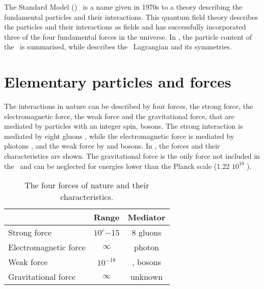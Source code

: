 The Standard Model (\SM)~\cite{Peskin:257493} 
is a name given in 1970s to a theory describing the fundamental particles and their interactions. This quantum field theory describes the particles and their interactions as fields and has successfully incorporated three of the four fundamental forces in the universe. In , the particle content of the \SM\ is summarised, while  describes  the \SM\ Lagrangian and its symmetries. 

\section{Elementary particles and forces}
\label{sec:SMcontent}
The interactions in nature can be described by four forces, the strong force, the electromagnetic force, the weak force and the gravitational force, that are mediated by particles with an integer spin, bosons. The strong interaction is mediated by eight gluons \Pgluon, while the electromagnetic force is mediated by photons \Pphoton, and the weak force by \PZ and \PWpm bosons. In , the forces and their characteristics are shown. The gravitational force is the only force not included in the \SM\ and can be neglected for energies lower than the Planck scale (1.22 $10^{19}$ \GeV).
\begin{table}[htbp]
	\centering
	\caption{The four forces of nature and their characteristics.}
	\begin{tabular}{lcc}
		\toprule
		& Range & Mediator \\ 
		\midrule
		Strong force & $10^e{-15}$ \m & 8 gluons  \\ 
	
		Electromagnetic force & $\infty$ & photon  \\ 
		 
		Weak force & $10^{-18}$ \m & \PWpm, \PZ bosons \\ 
		
		Gravitational force & $\infty$ & unknown \\ 
		\bottomrule
	\end{tabular} 
	\label{tab:forces}
\end{table}

